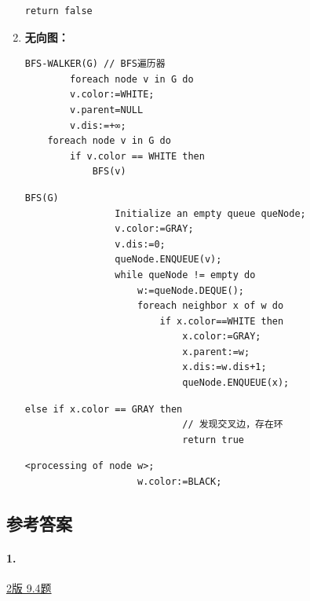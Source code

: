 \documentclass{article}
\begin{document}
\begin{enumerate}
\begin{lstlisting}[style=algorithm]
        return false
    \end{lstlisting}


    \item \textbf{无向图：\\}

    \begin{lstlisting}[style=algorithmPPT]
    BFS-WALKER(G) // BFS遍历器
        foreach node v in G do
        v.color:=WHITE; 
        v.parent=NULL 
        v.dis:=+∞;
    foreach node v in G do
        if v.color == WHITE then
            BFS(v)
    \end{lstlisting}

    \begin{lstlisting}[style=algorithmPPT]
            BFS(G)
                Initialize an empty queue queNode;
                v.color:=GRAY;
                v.dis:=0;
                queNode.ENQUEUE(v);
                while queNode != empty do
                    w:=queNode.DEQUE();
                    foreach neighbor x of w do
                        if x.color==WHITE then
                            x.color:=GRAY;
                            x.parent:=w;
                            x.dis:=w.dis+1;
                            queNode.ENQUEUE(x);
                    \end{lstlisting}

    \begin{lstlisting}[style=algorithm]
                        else if x.color == GRAY then
                            // 发现交叉边，存在环
                            return true
                        \end{lstlisting}

    \begin{lstlisting}[style=algorithmPPT]
                    <processing of node w>;
                    w.color:=BLACK;
                \end{lstlisting}
\end{enumerate}

\pagebreak

\subsection{参考答案}

\paragraph{1.}

\href{https://github.com/Shannju/njucser_helphelp/blob/main/Algorithm%E7%AE%97%E6%B3%95/%E7%AD%94%E6%A1%88/P4~7.pdf}{2版 9.4题}
\end{document}
